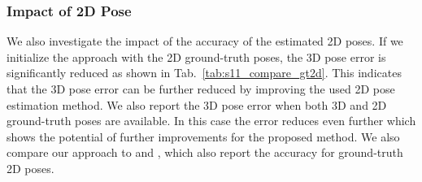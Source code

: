 \documentclass[10pt,journal,compsoc]{IEEEtran}
\begin{document}
\subsubsection*{Impact of 2D Pose}\label{exp:comp_p2}
We also investigate the impact of the accuracy of the estimated 2D poses. 
If we initialize the approach with the 2D ground-truth poses, the 3D pose error is significantly reduced as 
shown in Tab.~\ref{tab:s11_compare_gt2d}. This indicates that the 3D pose error can be further reduced by improving
the used 2D pose estimation method. We also report the 3D pose error when both 3D and 2D ground-truth poses are available. In this case 
the error reduces even further which shows the potential of further improvements for the proposed method. We also compare our approach to \cite{Yasin_2016_CVPR} and \cite{chen2017matching}, which also report the accuracy for ground-truth 2D poses.     
\end{document}

